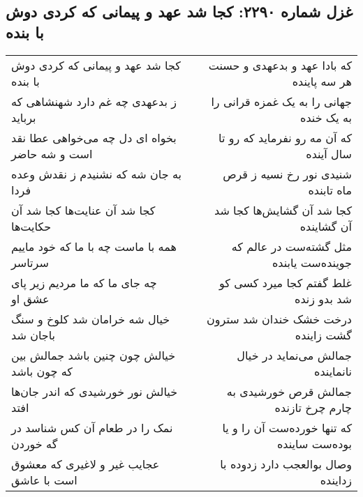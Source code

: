 \begin{center}
\section*{غزل شماره ۲۲۹۰: کجا شد عهد و پیمانی که کردی دوش با بنده}
\label{sec:2290}
\begin{longtable}{l p{0.5cm} r}
کجا شد عهد و پیمانی که کردی دوش با بنده
&&
که بادا عهد و بدعهدی و حسنت هر سه پاینده
\\
ز بدعهدی چه غم دارد شهنشاهی که برباید
&&
جهانی را به یک غمزه قرانی را به یک خنده
\\
بخواه ای دل چه می‌خواهی عطا نقد است و شه حاضر
&&
که آن مه رو نفرماید که رو تا سال آینده
\\
به جان شه که نشنیدم ز نقدش وعده فردا
&&
شنیدی نور رخ نسیه ز قرص ماه تابنده
\\
کجا شد آن عنایت‌ها کجا شد آن حکایت‌ها
&&
کجا شد آن گشایش‌ها کجا شد آن گشاینده
\\
همه با ماست چه با ما که خود ماییم سرتاسر
&&
مثل گشته‌ست در عالم که جوینده‌ست یابنده
\\
چه جای ما که ما مردیم زیر پای عشق او
&&
غلط گفتم کجا میرد کسی کو شد بدو زنده
\\
خیال شه خرامان شد کلوخ و سنگ باجان شد
&&
درخت خشک خندان شد سترون گشت زاینده
\\
خیالش چون چنین باشد جمالش بین که چون باشد
&&
جمالش می‌نماید در خیال نانماینده
\\
خیالش نور خورشیدی که اندر جان‌ها افتد
&&
جمالش قرص خورشیدی به چارم چرخ تازنده
\\
نمک را در طعام آن کس شناسد در گه خوردن
&&
که تنها خورده‌ست آن را و یا بوده‌ست ساینده
\\
عجایب غیر و لاغیری که معشوق است با عاشق
&&
وصال بوالعجب دارد زدوده با زداینده
\\
\end{longtable}
\end{center}
